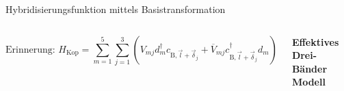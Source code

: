 \documentclass[aspectratio=1610, 9pt, xcolor=dvipsnames]{beamer}
\makeatletter
\newcommand*\widefbox[1]{\fbox{\hspace{2em}#1\hspace{2em}}}
\newcommand{\mathleft}{\@fleqntrue\@mathmargin0pt}
\newcommand{\mathcenter}{\@fleqnfalse}
\makeatother
\begin{document}
  \begin{frame}{Hybridisierungsfunktion mittels Basistransformation}
\begin{columns}
  \mathleft
    \begin{equation*}
      \text{Erinnerung: } H_\text{Kop} = \sum_{m=1}^5 \sum_{j=1}^3 \left ( V_{mj} d_m^\dagger c_{\text{B},\vec{l}+\vec{\delta}_j} + \overline{V}_{mj} c_{\text{B},\vec{l}+\vec{\delta}_j}^\dagger d_m \right )
    \end{equation*}
    \mathcenter
    \vspace*{1cm}
\begin{center}
 \color{tugreen} \huge \textbf{Effektives Drei-Bänder Modell} 
\end{center}
\hspace{-0.5cm}
\includegraphics[width=\textwidth]{Plots/3band.pdf}

\end{columns}
\end{frame}
\end{document}
